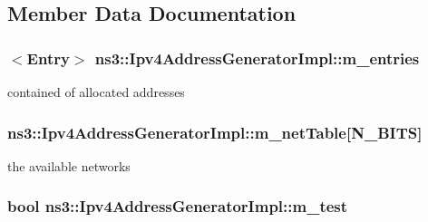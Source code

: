 \subsection{Member Data Documentation}
\subsubsection[{\texorpdfstring{m\+\_\+entries}{m_entries}}]{$<${\bf Entry}$>$ ns3\+::\+Ipv4\+Address\+Generator\+Impl\+::m\+\_\+entries\hspace{0.3cm}{\ttfamily [private]}}\hypertarget{classns3_1_1Ipv4AddressGeneratorImpl_aa038cfd5736c3d67f5433c3a2aa20cbf}{}\label{classns3_1_1Ipv4AddressGeneratorImpl_aa038cfd5736c3d67f5433c3a2aa20cbf}


contained of allocated addresses 

\subsubsection[{\texorpdfstring{m\+\_\+net\+Table}{m_netTable}}]{ ns3\+::\+Ipv4\+Address\+Generator\+Impl\+::m\+\_\+net\+Table\mbox{[}{\bf N\+\_\+\+B\+I\+TS}\mbox{]}\hspace{0.3cm}{\ttfamily [private]}}\hypertarget{classns3_1_1Ipv4AddressGeneratorImpl_a9cdf3f8008d6e9d7ce32272db4d6dcc9}{}\label{classns3_1_1Ipv4AddressGeneratorImpl_a9cdf3f8008d6e9d7ce32272db4d6dcc9}


the available networks 

\subsubsection[{\texorpdfstring{m\+\_\+test}{m_test}}]{\setlength{\rightskip}{0pt plus 5cm}bool ns3\+::\+Ipv4\+Address\+Generator\+Impl\+::m\+\_\+test\hspace{0.3cm}{\ttfamily [private]}}\hypertarget{classns3_1_1Ipv4AddressGeneratorImpl_ae80732b27ea2032ba783dce3f92d264b}{}\label{classns3_1_1Ipv4AddressGeneratorImpl_ae80732b27ea2032ba783dce3f92d264b}


